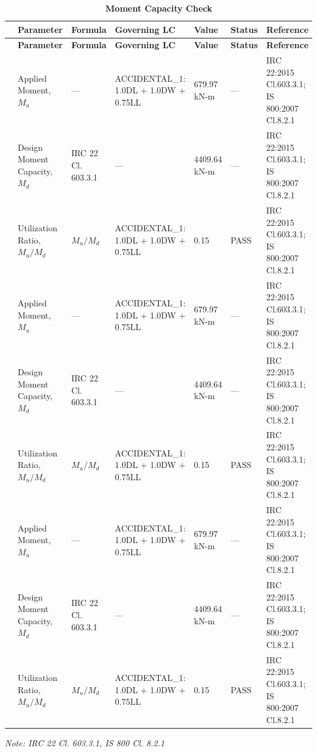 \documentclass[12pt,a4paper]{report}
\numberwithin{table}{chapter}
\numberwithin{figure}{chapter}
\begin{document}
\vspace{1em}
\begin{longtable}{|C{1.3cm}|C{2.5cm}|C{2.3cm}|>{\centering\arraybackslash}p{3.0cm}|C{2.4cm}|C{1.4cm}|C{2.4cm}|}
\caption{\textbf{Moment Capacity Check}}
\hline
\textbf{} & \textbf{Parameter} & \textbf{Formula} & \textbf{Governing LC} & \textbf{Value} & \textbf{Status} & \textbf{Reference} \\[6pt]
\hline
\endfirsthead

\hline
\textbf{} & \textbf{Parameter} & \textbf{Formula} & \textbf{Governing LC} & \textbf{Value} & \textbf{Status} & \textbf{Reference} \\[6pt]
\hline
\endhead
{} & Applied Moment, $M_u$ & --- & ACCIDENTAL\_\allowbreak{}1:\allowbreak{} 1.0DL + 1.0DW + 0.75LL & 679.97 kN-m & --- & IRC 22:2015 Cl.603.3.1; IS 800:2007 Cl.8.2.1 \\[6pt]
 & Design Moment Capacity, $M_d$ & IRC 22 Cl. 603.3.1 & --- & 4409.64 kN-m & --- & IRC 22:2015 Cl.603.3.1; IS 800:2007 Cl.8.2.1 \\[6pt]
 & Utilization Ratio, $M_u / M_d$ & $M_u / M_d$ & ACCIDENTAL\_\allowbreak{}1:\allowbreak{} 1.0DL + 1.0DW + 0.75LL & 0.15 & PASS & IRC 22:2015 Cl.603.3.1; IS 800:2007 Cl.8.2.1 \\[6pt]
\hline
{} & Applied Moment, $M_u$ & --- & ACCIDENTAL\_\allowbreak{}1:\allowbreak{} 1.0DL + 1.0DW + 0.75LL & 679.97 kN-m & --- & IRC 22:2015 Cl.603.3.1; IS 800:2007 Cl.8.2.1 \\[6pt]
 & Design Moment Capacity, $M_d$ & IRC 22 Cl. 603.3.1 & --- & 4409.64 kN-m & --- & IRC 22:2015 Cl.603.3.1; IS 800:2007 Cl.8.2.1 \\[6pt]
 & Utilization Ratio, $M_u / M_d$ & $M_u / M_d$ & ACCIDENTAL\_\allowbreak{}1:\allowbreak{} 1.0DL + 1.0DW + 0.75LL & 0.15 & PASS & IRC 22:2015 Cl.603.3.1; IS 800:2007 Cl.8.2.1 \\[6pt]
\hline
{} & Applied Moment, $M_u$ & --- & ACCIDENTAL\_\allowbreak{}1:\allowbreak{} 1.0DL + 1.0DW + 0.75LL & 679.97 kN-m & --- & IRC 22:2015 Cl.603.3.1; IS 800:2007 Cl.8.2.1 \\[6pt]
 & Design Moment Capacity, $M_d$ & IRC 22 Cl. 603.3.1 & --- & 4409.64 kN-m & --- & IRC 22:2015 Cl.603.3.1; IS 800:2007 Cl.8.2.1 \\[6pt]
 & Utilization Ratio, $M_u / M_d$ & $M_u / M_d$ & ACCIDENTAL\_\allowbreak{}1:\allowbreak{} 1.0DL + 1.0DW + 0.75LL & 0.15 & PASS & IRC 22:2015 Cl.603.3.1; IS 800:2007 Cl.8.2.1 \\[6pt]
\hline
\end{longtable}
\noindent\textit{Note: IRC 22 Cl. 603.3.1, IS 800 Cl. 8.2.1}
\end{document}
